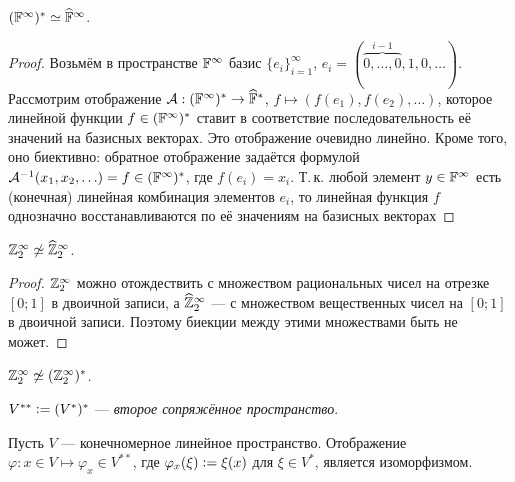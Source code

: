 \begin{proposal}
    $(\mathbb{F}^\infty)^\ast \simeq \widehat{\mathbb{F}}^\infty$.
\end{proposal}

\begin{proof}
    Возьмём в пространстве $\mathbb{F}^\infty$ базис $\{e_i\}_{i = 1}^\infty$, $e_i = (\overbrace{0, \ldots, 0}^{i - 1}, 1, 0, \ldots)$. Рассмотрим отображение $\mathcal{A}: (\mathbb{F}^\infty)^\ast \to \widehat{\mathbb{F}}^\ast$, $f \mapsto (f(e_1), f(e_2), \ldots)$, которое линейной функции $f \in (\mathbb{F}^\infty)^\ast$ ставит в соответствие последовательность её значений на базисных векторах. Это отображение очевидно линейно. Кроме того, оно биективно: обратное отображение задаётся формулой $\mathcal{A}^{-1}(x_1, x_2, \ldots) = f \in (\mathbb{F}^\infty)^\ast$, где $f(e_i) = x_i$. Т.\,к. любой элемент $y \in \mathbb{F}^\infty$ есть (конечная) линейная комбинация элементов $e_i$, то линейная функция $f$ однозначно восстанавливаются по её значениям на базисных векторах
\end{proof}

\begin{proposal}
    $\mathbb{Z}_2^\infty \not\simeq \widehat{\mathbb{Z}}_2^\infty$.
\end{proposal}

\begin{proof}
    $\mathbb{Z}_2^\infty$ можно отождествить с множеством рациональных чисел на отрезке $[0; 1]$ в двоичной записи, а $\widehat{\mathbb{Z}}_2^\infty$ --- с множеством вещественных чисел на $[0; 1]$ в двоичной записи. Поэтому биекции между этими множествами быть не может.
\end{proof}

\begin{corollary}
    $\mathbb{Z}_2^\infty \not\simeq (\mathbb{Z}_2^\infty)^\ast$.
\end{corollary}

\begin{definition}
    $V^{\ast\ast} \vcentcolon= (V^\ast)^\ast$ --- \textit{второе сопряжённое пространство}.
\end{definition}

\begin{theorem}
    Пусть $V$ --- конечномерное линейное пространство. Отображение $\varphi: x \in V \mapsto \varphi_x \in V^{\ast\ast}$, где $\varphi_x(\xi) \vcentcolon = \xi(x)$ для $\xi \in V^\ast$, является изоморфизмом.
\end{theorem}

